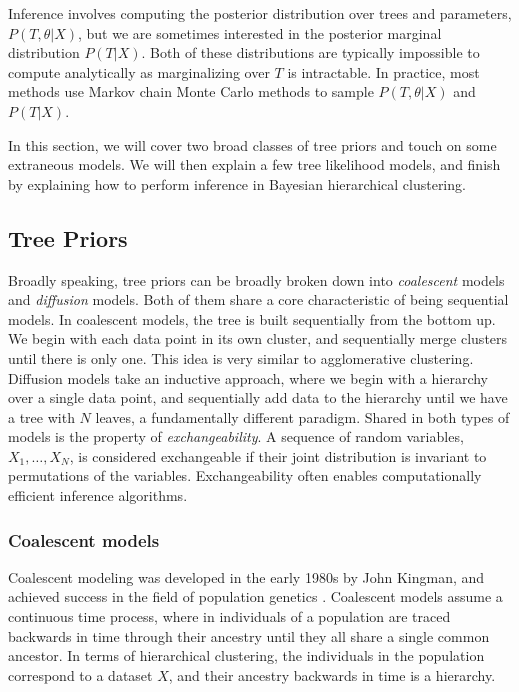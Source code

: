 \documentclass{article}
\begin{document}
Inference involves computing the posterior
distribution over trees and parameters, 
$P(T, \theta | X)$, but we are sometimes interested
in the
posterior marginal distribution $P(T | X)$.
Both of these distributions are typically
impossible to compute
analytically as marginalizing over $T$
is intractable.
In practice, most methods use Markov chain Monte Carlo
methods to sample $P(T, \theta | X)$
and $P(T|X)$.

In this section, we will cover two broad
classes of tree priors and touch on
some extraneous models. We will then explain
a few tree likelihood models, and 
finish by explaining how to perform
inference in Bayesian hierarchical clustering.

\subsection{Tree Priors}

Broadly speaking, 
tree priors can be broadly broken down into 
\emph{coalescent} models
and 
\emph{diffusion} models.
Both of them share a core characteristic
of being sequential models.
In coalescent models, the tree is built sequentially
from the bottom up. We begin with each
data point in its own cluster,
and sequentially merge clusters until
there is only one. This idea is
very similar to agglomerative clustering.
Diffusion models take an inductive approach,
where we begin with a hierarchy over a single
data point, and sequentially add data to the hierarchy until
we have a tree with $N$ leaves,
a fundamentally different paradigm.
Shared in both types of models is the property
of
\emph{exchangeability}.
A sequence of random variables, $X_1, \ldots, X_N$,
is considered exchangeable
if their joint distribution
is invariant to permutations of the variables.
Exchangeability often enables computationally efficient
inference algorithms.

\subsubsection*{Coalescent models}

Coalescent modeling was developed
in the early 1980s by John Kingman,
and achieved success in the field
of population genetics
\citep{Kingman1982}.
Coalescent models assume a
continuous time process,
where in individuals of a population
are traced backwards in time
through their ancestry until
they all share a single common ancestor.
In terms of hierarchical clustering,
the individuals in the population
correspond to a dataset $X$,
and their
ancestry backwards in time
is a hierarchy.
\end{document}
